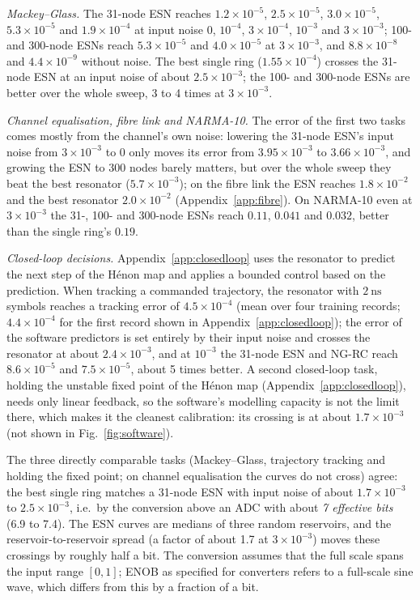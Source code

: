 \emph{Mackey--Glass.} The 31-node ESN reaches $1.2\times10^{-5}$, $2.5\times10^{-5}$, $3.0\times10^{-5}$, $5.3\times10^{-5}$ and
$1.9\times10^{-4}$ at input noise 0, $10^{-4}$, $3\times10^{-4}$, $10^{-3}$ and $3\times10^{-3}$; 100- and 300-node ESNs reach
$5.3\times10^{-5}$ and $4.0\times10^{-5}$ at $3\times10^{-3}$, and $8.8\times10^{-8}$ and $4.4\times10^{-9}$ without noise. The best
single ring ($1.55\times10^{-4}$) crosses the 31-node ESN at an input noise of about $2.5\times10^{-3}$; the 100- and 300-node ESNs are
better over the whole sweep, 3 to 4 times at $3\times10^{-3}$.

\emph{Channel equalisation, fibre link and NARMA-10.} The error of the first two tasks comes mostly from the channel's own noise:
lowering the 31-node ESN's input noise from $3\times10^{-3}$ to 0 only moves its error from $3.95\times10^{-3}$ to
$3.66\times10^{-3}$, and growing the ESN to 300 nodes barely matters, but over the whole sweep they beat the best resonator
($5.7\times10^{-3}$); on the fibre link the ESN reaches $1.8\times10^{-2}$ and the best resonator $2.0\times10^{-2}$
(Appendix~\ref{app:fibre}). On NARMA-10 even at $3\times10^{-3}$ the 31-, 100- and 300-node ESNs reach $0.11$, $0.041$ and $0.032$,
better than the single ring's $0.19$.

\emph{Closed-loop decisions.} Appendix~\ref{app:closedloop} uses the resonator to predict the next step of the Hénon map and applies a
bounded control based on the prediction. When tracking a commanded trajectory, the resonator with $2~\mathrm{ns}$ symbols reaches a
tracking error of $4.5\times10^{-4}$ (mean over four training records; $4.4\times10^{-4}$ for the first record shown in
Appendix~\ref{app:closedloop}); the error of the software predictors is set entirely by their input noise and crosses the
resonator at about $2.4\times10^{-3}$, and at $10^{-3}$ the 31-node ESN and NG-RC reach $8.6\times10^{-5}$ and $7.5\times10^{-5}$,
about 5 times better. A second closed-loop task, holding the unstable fixed point of the Hénon map (Appendix~\ref{app:closedloop}), needs only linear
feedback, so the software's modelling capacity is not the limit there, which makes it the cleanest calibration: its crossing is at
about $1.7\times10^{-3}$ (not shown in Fig.~\ref{fig:software}).

The three directly comparable tasks (Mackey--Glass, trajectory tracking and holding the fixed point; on channel equalisation the
curves do not cross) agree: the best single ring matches a 31-node ESN with input noise of about $1.7\times10^{-3}$ to
$2.5\times10^{-3}$, i.e.\ by the conversion above an ADC with about \emph{7 effective bits} (6.9 to 7.4). The ESN curves are medians of
three random reservoirs, and the reservoir-to-reservoir spread (a factor of about 1.7 at $3\times10^{-3}$) moves these crossings by
roughly half a bit. The conversion assumes that the full scale spans the input range $[0,1]$; ENOB as specified for converters refers
to a full-scale sine wave, which differs from this by a fraction of a bit.

